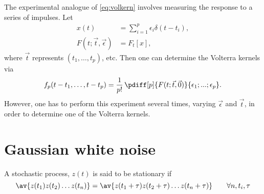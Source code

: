 \documentclass[12pt]{article}
\begin{document}
\begin{rem}
  The experimental analogue of \eqref{eq:volkern} involves measuring the response to a series of impulses.
  Let
  \begin{equation}\label{eq:imulses}
  \begin{aligned}
    x(t) &= \sum_{i=1}^p \epsilon_i \delta(t-t_i), \\
    F(t;\vec{t},\vec{\epsilon} ) &= F_t[x],
  \end{aligned}
  \end{equation}
  where $\vec{t}$ represents $(t_1,\ldots,t_p)$, etc.
  Then one can determine the Volterra kernels via
  \begin{equation}\label{eq:impkern}
    f_p(t-t_1,\ldots,t-t_p) = \frac{1}{p!}\, \pdiff[p]{F(t;\vec{t},\vec{0})}{\epsilon_1;...;\epsilon_p}.
  \end{equation}
  However, one has to perform this experiment several times, varying $\vec{\epsilon}$ and $\vec{t}$, in order to determine one of the Volterra kernels.
\end{rem}



\section{Gaussian white noise}\label{sec:whitenoise}

\begin{defn}
  A stochastic process, $z(t)$ is said to be stationary if
  \begin{equation}\label{eq:statproc}
    \av{z(t_1)z(t_2) \ldots z(t_n)} = \av{z(t_1+\tau)z(t_2+\tau) \ldots z(t_n+\tau)}
    \qquad \forall n,t_i,\tau
  \end{equation}
\end{defn}
\end{document}
